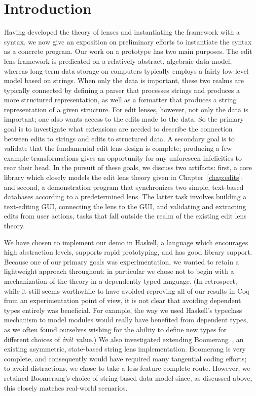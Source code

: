 \section{Introduction}
\label{sec:impl-intro}
Having developed the theory of lenses and instantiating the framework with a
syntax, we now give an exposition on preliminary efforts to instantiate the
syntax as a concrete program. Our work on a prototype has two main purposes.
The edit lens framework is predicated on a relatively abstract, algebraic
data model, whereas long-term data storage on computers typically employs a
fairly low-level model based on strings. When only the data is important,
these two realms are typically connected by defining a parser that processes
strings and produces a more structured representation, as well as a
formatter that produces a string representation of a given structure. For
edit lenses, however, not only the data is important; one also wants access
to the edits made to the data. So the primary goal is to investigate what
extensions are needed to describe the connection between edits to strings
and edits to structured data. A secondary goal is to validate that the
fundamental edit lens design is complete; producing a few example
transformations gives an opportunity for any unforeseen infelicities to rear
their head. In the pursuit of these goals, we discuss two artifacts: first,
a core library which closely models the edit lens theory given in
Chapter~\ref{chap:edits}; and second, a demonstration program that
synchronizes two simple, text-based databases according to a predetermined
lens. The latter task involves building a text-editing GUI, connecting the
lens to the GUI, and validating and extracting edits from user actions,
tasks that fall outside the realm of the existing edit lens theory.

We have chosen to implement our demo in Haskell, a language which encourages
high abstraction levels, supports rapid prototyping, and has good library
support. Because one of our primary goals was experimentation, we wanted to
retain a lightweight approach throughout; in particular we chose not to
begin with a mechanization of the theory in a dependently-typed language.
(In retrospect, while it still seems worthwhile to have avoided reproving
all of our results in Coq from an experimentation point of view, it is not
clear that avoiding dependent types entirely was beneficial. For example,
the way we used Haskell's typeclass mechanism to model modules would really
have benefited from dependent types, as we often found ourselves wishing for
the ability to define new types for different choices of $\mathit{init}$ value.) We
also investigated extending Boomerang~\cite{Boomerang07}, an existing
asymmetric, state-based string lens implementation. Boomerang is very
complete, and consequently would have required many tangential coding
efforts; to avoid distractions, we chose to take a less feature-complete
route. However, we retained Boomerang's choice of string-based data model
since, as discussed above, this closely matches real-world scenarios.

